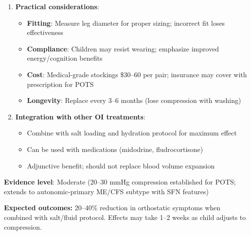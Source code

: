 \begin{recommendation}
\begin{enumerate}
    \item \textbf{Practical considerations}:
    \begin{itemize}
        \item \textbf{Fitting}: Measure leg diameter for proper sizing; incorrect fit loses effectiveness
        \item \textbf{Compliance}: Children may resist wearing; emphasize improved energy/cognition benefits
        \item \textbf{Cost}: Medical-grade stockings \$30--60 per pair; insurance may cover with prescription for POTS
        \item \textbf{Longevity}: Replace every 3--6 months (lose compression with washing)
    \end{itemize}

    \item \textbf{Integration with other OI treatments}:
    \begin{itemize}
        \item Combine with salt loading and hydration protocol for maximum effect
        \item Can be used with medications (midodrine, fludrocortisone)
        \item Adjunctive benefit; should not replace blood volume expansion
    \end{itemize}
\end{enumerate}

\textbf{Evidence level}: Moderate (20--30 mmHg compression established for POTS; extends to autonomic-primary ME/CFS subtype with SFN features)

\textbf{Expected outcomes:} 20--40\% reduction in orthostatic symptoms when combined with salt/fluid protocol. Effects may take 1--2 weeks as child adjusts to compression.

\end{recommendation}

